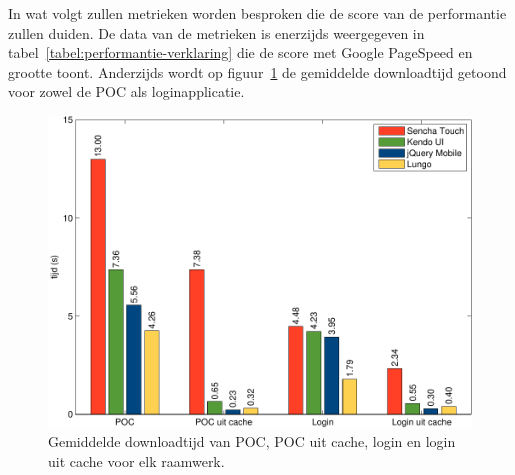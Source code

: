 In wat volgt zullen metrieken worden besproken die de score van de performantie zullen duiden.
De data van de metrieken is enerzijds weergegeven in tabel~\ref{tabel:performantie-verklaring} die de score met Google PageSpeed en grootte toont.
Anderzijds wordt op figuur~\ref{fig:performantie} de gemiddelde downloadtijd getoond voor zowel de POC als loginapplicatie.

\begin{table}
\centering
{}
\caption{Duiding bij performantie van de loginapplicatie.}
\label{tabel:performantie-verklaring}
\end{table}


\begin{figure}
 \centering
 \includegraphics[width=\textwidth]{figuren/performance-nl.pdf}
 \caption{Gemiddelde downloadtijd van POC,  POC uit cache,  login en login uit cache voor elk raamwerk.}
 \label{fig:performantie}
\end{figure}

